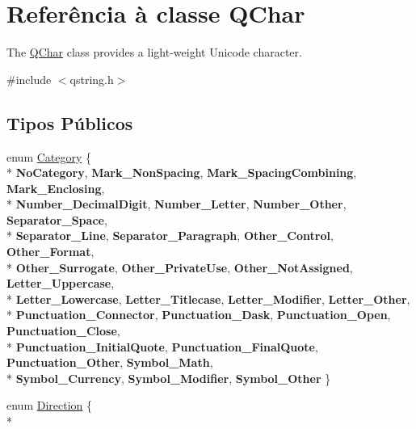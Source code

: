 \hypertarget{class_q_char}{\section{Referência à classe Q\-Char}
\label{class_q_char}
}


The \hyperlink{class_q_char}{Q\-Char} class provides a light-\/weight Unicode character.  




{\ttfamily \#include $<$qstring.\-h$>$}

\subsection*{Tipos Públicos}
\begin{DoxyCompactItemize}
\item 
enum \hyperlink{class_q_char_a9ca8f05608edcbf85ab6c2c85a439ccb}{Category} \{ \\*
{\bfseries No\-Category}, 
{\bfseries Mark\-\_\-\-Non\-Spacing}, 
{\bfseries Mark\-\_\-\-Spacing\-Combining}, 
{\bfseries Mark\-\_\-\-Enclosing}, 
\\*
{\bfseries Number\-\_\-\-Decimal\-Digit}, 
{\bfseries Number\-\_\-\-Letter}, 
{\bfseries Number\-\_\-\-Other}, 
{\bfseries Separator\-\_\-\-Space}, 
\\*
{\bfseries Separator\-\_\-\-Line}, 
{\bfseries Separator\-\_\-\-Paragraph}, 
{\bfseries Other\-\_\-\-Control}, 
{\bfseries Other\-\_\-\-Format}, 
\\*
{\bfseries Other\-\_\-\-Surrogate}, 
{\bfseries Other\-\_\-\-Private\-Use}, 
{\bfseries Other\-\_\-\-Not\-Assigned}, 
{\bfseries Letter\-\_\-\-Uppercase}, 
\\*
{\bfseries Letter\-\_\-\-Lowercase}, 
{\bfseries Letter\-\_\-\-Titlecase}, 
{\bfseries Letter\-\_\-\-Modifier}, 
{\bfseries Letter\-\_\-\-Other}, 
\\*
{\bfseries Punctuation\-\_\-\-Connector}, 
{\bfseries Punctuation\-\_\-\-Dask}, 
{\bfseries Punctuation\-\_\-\-Open}, 
{\bfseries Punctuation\-\_\-\-Close}, 
\\*
{\bfseries Punctuation\-\_\-\-Initial\-Quote}, 
{\bfseries Punctuation\-\_\-\-Final\-Quote}, 
{\bfseries Punctuation\-\_\-\-Other}, 
{\bfseries Symbol\-\_\-\-Math}, 
\\*
{\bfseries Symbol\-\_\-\-Currency}, 
{\bfseries Symbol\-\_\-\-Modifier}, 
{\bfseries Symbol\-\_\-\-Other}
 \}
\item 
enum \hyperlink{class_q_char_a224b9163917ac32fc95a60d8c1eec3aa}{Direction} \{ \\*

\end{DoxyCompactItemize}
